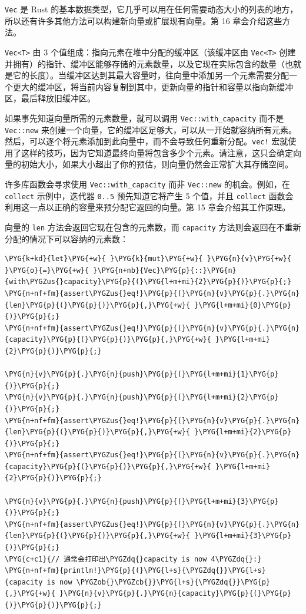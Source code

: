 \texttt{Vec} 是 Rust 的基本数据类型，它几乎可以用在任何需要动态大小的列表的地方，所以还有许多其他方法可以构建新向量或扩展现有向量。第 16 章会介绍这些方法。

\texttt{Vec<T>} 由 3 个值组成：指向元素在堆中分配的缓冲区（该缓冲区由 \texttt{Vec<T>} 创建并拥有）的指针、缓冲区能够存储的元素数量，以及它现在实际包含的数量（也就是它的长度）。当缓冲区达到其最大容量时，往向量中添加另一个元素需要分配一个更大的缓冲区，将当前内容复制到其中，更新向量的指针和容量以指向新缓冲区，最后释放旧缓冲区。

如果事先知道向量所需的元素数量，就可以调用 \texttt{Vec::with\_capacity} 而不是 \texttt{Vec::new} 来创建一个向量，它的缓冲区足够大，可以从一开始就容纳所有元素。然后，可以逐个将元素添加到此向量中，而不会导致任何重新分配。\texttt{vec!} 宏就使用了这样的技巧，因为它知道最终向量将包含多少个元素。请注意，这只会确定向量的初始大小，如果大小超出了你的预估，则向量仍然会正常扩大其存储空间。

许多库函数会寻求使用 \texttt{Vec::with\_capacity} 而非 \texttt{Vec::new} 的机会。例如，在 \texttt{collect} 示例中，迭代器 \texttt{0..5} 预先知道它将产生 5 个值，并且 \texttt{collect} 函数会利用这一点以正确的容量来预分配它返回的向量。第 15 章会介绍其工作原理。

向量的 \texttt{len} 方法会返回它现在包含的元素数，而 \texttt{capacity} 方法则会返回在不重新分配的情况下可以容纳的元素数：

\begin{Verbatim}[commandchars=\\\{\},breaklines=true,breakanywhere=true,fontsize=\codefont,xleftmargin=17bp]
\PYG{k+kd}{let}\PYG{+w}{ }\PYG{k}{mut}\PYG{+w}{ }\PYG{n}{v}\PYG{+w}{ }\PYG{o}{=}\PYG{+w}{ }\PYG{n+nb}{Vec}\PYG{p}{::}\PYG{n}{with\PYGZus{}capacity}\PYG{p}{(}\PYG{l+m+mi}{2}\PYG{p}{)}\PYG{p}{;}
\PYG{n+nf+fm}{assert\PYGZus{}eq!}\PYG{p}{(}\PYG{n}{v}\PYG{p}{.}\PYG{n}{len}\PYG{p}{(}\PYG{p}{)}\PYG{p}{,}\PYG{+w}{ }\PYG{l+m+mi}{0}\PYG{p}{)}\PYG{p}{;}
\PYG{n+nf+fm}{assert\PYGZus{}eq!}\PYG{p}{(}\PYG{n}{v}\PYG{p}{.}\PYG{n}{capacity}\PYG{p}{(}\PYG{p}{)}\PYG{p}{,}\PYG{+w}{ }\PYG{l+m+mi}{2}\PYG{p}{)}\PYG{p}{;}

\PYG{n}{v}\PYG{p}{.}\PYG{n}{push}\PYG{p}{(}\PYG{l+m+mi}{1}\PYG{p}{)}\PYG{p}{;}
\PYG{n}{v}\PYG{p}{.}\PYG{n}{push}\PYG{p}{(}\PYG{l+m+mi}{2}\PYG{p}{)}\PYG{p}{;}
\PYG{n+nf+fm}{assert\PYGZus{}eq!}\PYG{p}{(}\PYG{n}{v}\PYG{p}{.}\PYG{n}{len}\PYG{p}{(}\PYG{p}{)}\PYG{p}{,}\PYG{+w}{ }\PYG{l+m+mi}{2}\PYG{p}{)}\PYG{p}{;}
\PYG{n+nf+fm}{assert\PYGZus{}eq!}\PYG{p}{(}\PYG{n}{v}\PYG{p}{.}\PYG{n}{capacity}\PYG{p}{(}\PYG{p}{)}\PYG{p}{,}\PYG{+w}{ }\PYG{l+m+mi}{2}\PYG{p}{)}\PYG{p}{;}

\PYG{n}{v}\PYG{p}{.}\PYG{n}{push}\PYG{p}{(}\PYG{l+m+mi}{3}\PYG{p}{)}\PYG{p}{;}
\PYG{n+nf+fm}{assert\PYGZus{}eq!}\PYG{p}{(}\PYG{n}{v}\PYG{p}{.}\PYG{n}{len}\PYG{p}{(}\PYG{p}{)}\PYG{p}{,}\PYG{+w}{ }\PYG{l+m+mi}{3}\PYG{p}{)}\PYG{p}{;}
\PYG{c+c1}{// 通常会打印出\PYGZdq{}capacity is now 4\PYGZdq{}:}
\PYG{n+nf+fm}{println!}\PYG{p}{(}\PYG{l+s}{\PYGZdq{}}\PYG{l+s}{capacity is now \PYGZob{}\PYGZcb{}}\PYG{l+s}{\PYGZdq{}}\PYG{p}{,}\PYG{+w}{ }\PYG{n}{v}\PYG{p}{.}\PYG{n}{capacity}\PYG{p}{(}\PYG{p}{)}\PYG{p}{)}\PYG{p}{;}
\end{Verbatim}

